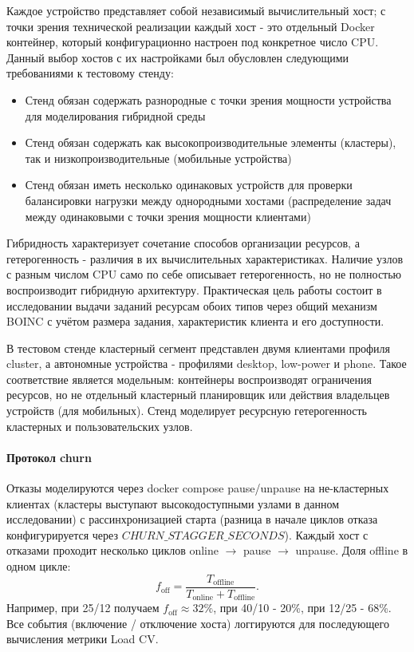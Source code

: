 \documentclass[a4paper,12pt]{extarticle}
\begin{document}
Каждое устройство представляет собой независимый вычислительный хост; с точки зрения технической реализации каждый хост - это отдельный Docker контейнер, который конфигурационно настроен под конкретное число CPU. Данный выбор хостов с их настройками был обусловлен следующими требованиями к тестовому стенду:

\begin{itemize}
    \item Стенд обязан содержать разнородные с точки зрения мощности устройства для моделирования гибридной среды
    \item Стенд обязан содержать как высокопроизводительные элементы (кластеры), так и низкопроизводительные (мобильные устройства)
    \item Стенд обязан иметь несколько одинаковых устройств для проверки балансировки нагрузки между однородными хостами (распределение задач между одинаковыми с точки зрения мощности клиентами)
\end{itemize}

Гибридность характеризует сочетание способов организации ресурсов, а гетерогенность - различия в их вычислительных характеристиках. Наличие узлов с разным числом CPU само по себе описывает гетерогенность, но не полностью воспроизводит гибридную архитектуру. Практическая цель работы состоит в исследовании выдачи заданий ресурсам обоих типов через общий механизм BOINC с учётом размера задания, характеристик клиента и его доступности.

В тестовом стенде кластерный сегмент представлен двумя клиентами профиля cluster, а автономные устройства - профилями desktop, low-power и phone. Такое соответствие является модельным: контейнеры воспроизводят ограничения ресурсов, но не отдельный кластерный планировщик или действия владельцев устройств (для мобильных). Стенд моделирует ресурсную гетерогенность кластерных и пользовательских узлов.

\paragraph{Протокол churn}
Отказы моделируются через docker compose pause/unpause на не-кластерных клиентах (кластеры выступают высокодоступными узлами в данном исследовании) с рассинхронизацией старта (разница в начале циклов отказа конфигурируется через $CHURN\_STAGGER\_SECONDS$). Каждый хост с отказами проходит несколько циклов online $\rightarrow$ pause $\rightarrow$ unpause. Доля offline в одном цикле:
\[
    f_{\text{off}} = \frac{T_{\text{offline}}}{T_{\text{online}} + T_{\text{offline}}}.
\]
Например, при 25/12 получаем $f_{\text{off}} \approx 32\%$, при 40/10 - 20\%, при 12/25 - 68\%. Все события (включение / отключение хоста) логгируются для последующего вычисления метрики Load CV.
\end{document}
